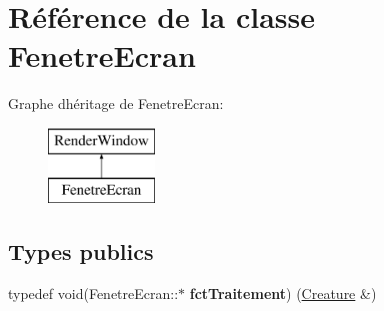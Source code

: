 \hypertarget{class_fenetre_ecran}{}\section{Référence de la classe Fenetre\+Ecran}
\label{class_fenetre_ecran}
Graphe d\textquotesingle{}héritage de Fenetre\+Ecran\+:\begin{figure}[H]
\begin{center}
\leavevmode
\includegraphics[height=2.000000cm]{class_fenetre_ecran}
\end{center}
\end{figure}
\subsection*{Types publics}
\begin{DoxyCompactItemize}
\item 
\mbox{\label{class_fenetre_ecran_a26dc0fcb251daea5f23c42daca0ca3af}} 
typedef void(Fenetre\+Ecran\+::$\ast$ {\bfseries fct\+Traitement}) (\mbox{\hyperlink{class_creature}{Creature}} \&)
\end{DoxyCompactItemize}
